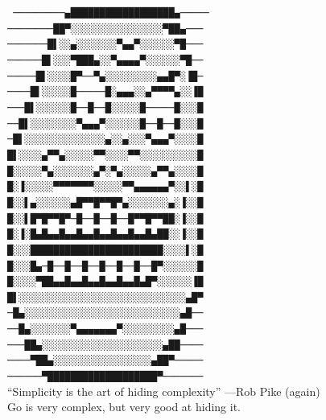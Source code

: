 \documentclass[xelatex,aspectratio=169]{beamer}
\begin{document}
\begin{frame}
\begin{centering}
\texttt{\tiny
─────────▄██████████████████▄─────\\
────────██▀░░░░░░░░░░░░░░░░▀██▄───\\
───────█▌░░▄░░░░░░░▀▄▄▀░░░░░░▀█───\\
──────█▌░░░▀███▄░░▀▄▄▄▄▀░░░░░░▀█──\\
─────█▌░░░░█▀──▀▄░░░░░░░░░▄▄█▀░▐█─\\
────█▌░░░░░█─────█░▄▄▄░░▄▀▀▀▀▄░░▐█\\
───█▌░░░░░░█──█──█░░░░░█─────█░░░█\\
──█▌░░░░░░░░▀▄▄▄▀░░░░░░█──█──█░░░█\\
─█▌░░░░░░░░░░░░░░▄░░▄░░░▀▄▄▄▀░░░░█\\
█▌░░░░▄▀▀▄░░░░░▀▀░░░░▀▀░░░░░░░░░░█\\
█░░░░░▀▄░░░░░░░▄▀░▀▄░░░░░▄▀▀▄░░░░█\\
█░▐░░░░░▀▀▀▀▀▀▀░░░░░▀▀▄▄▄▄▄▄▀░░▌░█\\
█░░▌▄░░░░░░▄█▀▀█▀▀█▀▄░░░░░░░▄░▐░░█\\
█░░▌█▀█▀▀█▀─█──█──█──█▀▀█▀▀██░▐░░█\\
█░▐░█▄█▄▄█▄▄█▄▄█▄▄█▄▄█▄▄█▄██░░▐░░█\\
█░░░███████████████████████░░░░▌░█\\
█░░░█▄─█──█──█──█──█──█──█▀░░░░░░█\\
█░░░░▀██▄▄█▄▄█▄▄█▄▄█▄▄█▄█▀░░░░░░▐█\\
█▌░░░░░░░░░░░░░░░░░░░░░░░░░░░░░▄█▀\\
─█▄░░░░░░░░░░░░░░░░░░░░░░░░░░░▄█──\\
──█▄░░░░░░░▀▄▄▄▄▄▄▄▀░░░░░░░░░▄█───\\
───██▄░░░░░░░░░░░░░░░░░░░░░▄██────\\
────▀██▄░░░░░░░░░░░░░░░░░▄██▀─────\\
──────▀███████████████████▀───────\\
}
``Simplicity is the art of hiding complexity'' ---Rob Pike (again)\\
Go is very complex, but very good at hiding it.\\
\end{centering}
\end{frame}

\begin{frame}
	\begin{fancyquote}
	\end{fancyquote}
\end{frame}
\end{document}
